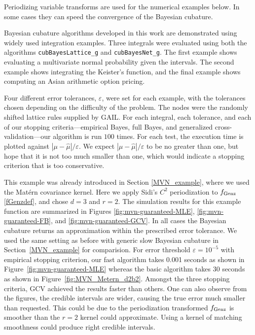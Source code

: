\documentclass{iitthesis}          %
\newcommand{\hmu}{\widehat{\mu}}
\newcommand{\code}[1]{\texttt{#1}}
\def\abs#1{\ensuremath{\left \lvert #1 \right \rvert}}
\newcommand\figref{Figure~\ref}
\newcommand\secref{Section~\ref}
\begin{document}
Periodizing variable transforms are used for the numerical examples below.  In some cases they can speed the convergence of the Bayesian cubature. 




Bayesian cubature algorithms developed in this work are demonstrated using widely used integration examples.
Three integrals were evaluated using both the algorithms \code{cubBayesLattice\_g} and \code{cubBayesNet\_g}. The first example shows evaluating a multivariate normal probability given the intervals. The second example shows integrating the Keister's function, and the final example shows computing an Asian arithmetic option pricing.  

\Section{Test Results and Observations for \code{cubBayesLattice\_g}}
\label{sec:numerical_experiments_cubBayesLattice}

Four different error tolerances, $\varepsilon$,  were set for each example, with the tolerances chosen depending on the difficulty of the problem.  The nodes were the randomly shifted lattice rules supplied by GAIL.  For each integral,  each tolerance, and each of our stopping criteria---empirical Bayes, full Bayes, and generalized cross-validation---our algorithm is run  $100$ times.  For each test, the execution time is plotted against $\abs{\mu - \hmu}/\varepsilon$.  We expect $\abs{\mu - \hmu}/\varepsilon$ to be no greater than one, but hope that it is not too much smaller than one, which would indicate a stopping criterion that is too conservative.


This example was already introduced in Section \ref{MVN_example}, where we used the Mat\'ern covariance kernel.  Here we apply Sidi's $C^2$  periodization to $ f_{\textup{Genz}}$ \eqref{fGenzdef}, and chose $d=3$ and $r=2$. The simulation results for this example function are summarized in Figures \ref{fig:mvn-guaranteed-MLE}, \ref{fig:mvn-guaranteed-FB}, and \ref{fig:mvn-guaranteed-GCV}.  In all cases the Bayesian cubature returns an approximation within the prescribed error tolerance. We used the same setting as before with generic slow Bayesian cubature in \secref{MVN_example} for comparision. For error threshold $\varepsilon=10^{-5}$ with empirical stopping criterion, our fast algorithm takes 0.001 seconds as shown in \figref{fig:mvn-guaranteed-MLE} whereas the basic algorithm takes 30 seconds as shown in \figref{fig:MVN_Metern_d2b2}. 
Amongst the three stopping criteria, GCV achieved the results faster than others. 
One can also observe from the figures, the credible intervals are wider, causing the true error much smaller than requested.
This could be due to the periodization transformed $f_\textup{Genz}$ is smoother than the $r=2$ kernel could approximate. Using a kernel of matching smoothness could produce right credible intervals.
\end{document}
